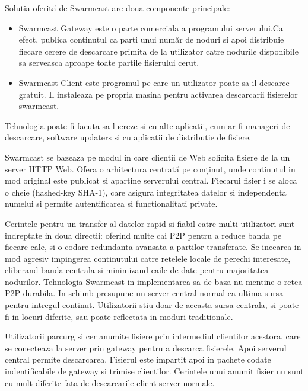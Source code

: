 Solutia oferită de Swarmcast are doua componente principale:

\begin{itemize}
  \item{Swarmcast Gateway este o parte comerciala a programului serverului.Ca
  efect, publica continutul ca parti unui număr de noduri si apoi distribuie
  fiecare cerere de descarcare primita de la utilizator catre nodurile
  disponibile sa serveasca aproape toate partile fisierului cerut.}
  \item{Swarmcast Client este programul pe care un utilizator poate sa il
  descarce gratuit. Il instaleaza pe propria masina pentru activarea
  descarcarii fisierelor swarmcast.}
\end{itemize}

Tehnologia poate fi facuta sa lucreze si cu alte aplicatii, cum ar fi manageri
de descarcare, software updaters si cu aplicatii de distributie de fisiere.

Swarmcast se bazeaza pe modul in care clientii de Web solicita fisiere de la
un server HTTP Web. Ofera o arhitectura centrată pe conținut, unde continutul
in mod original este publicat si apartine serverului central. Fiecarui fisier
i se aloca o cheie (hashed-key SHA-1), care asigura integritatea datelor si
independenta numelui si permite autentificarea si functionalitati private. 

Cerintele pentru un transfer al datelor rapid si fiabil catre multi
utilizatori sunt indreptate in doua directii: oferind multe cai P2P pentru a
reduce banda pe fiecare cale, si o codare redundanta avansata a partilor
transferate. Se incearca in mod agresiv impingerea continutului catre retelele
locale de perechi interesate, eliberand banda centrala si minimizand caile de
date pentru majoritatea nodurilor. Tehnologia Swarmcast in implementarea sa de
baza nu mentine o retea P2P durabila. In schimb presupune un server central
normal ca ultima sursa pentru intregul continut. Utilizatorii stiu doar de
aceasta sursa centrala, si poate fi in locuri diferite, sau poate reflectata
in moduri traditionale.

Utilizatorii parcurg si cer anumite fisiere prin intermediul clientilor
acestora, care se conecteaza la server prin gateway pentru a descarca
fisierele. Apoi serverul central permite descarcarea. Fisierul este impartit
apoi in pachete codate indentificabile de gateway si trimise clientilor.
Cerintele unui anumit fisier nu sunt cu mult diferite fata de descarcarile
client-server normale.

